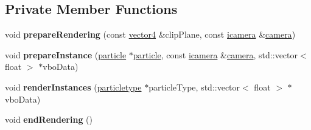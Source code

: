 \subsection*{Private Member Functions}
\begin{DoxyCompactItemize}
\item 
\mbox{\label{classflounder_1_1rendererparticles_a12c825ccf5a57a3af4cb04b3b2871ca4}} 
void {\bfseries prepare\+Rendering} (const \hyperlink{classflounder_1_1vector4}{vector4} \&clip\+Plane, const \hyperlink{classflounder_1_1icamera}{icamera} \&\hyperlink{classflounder_1_1camera}{camera})
\item 
\mbox{\label{classflounder_1_1rendererparticles_a8e1eee2b2acbbdb967e4f4df6f025b07}} 
void {\bfseries prepare\+Instance} (\hyperlink{classflounder_1_1particle}{particle} $\ast$\hyperlink{classflounder_1_1particle}{particle}, const \hyperlink{classflounder_1_1icamera}{icamera} \&\hyperlink{classflounder_1_1camera}{camera}, std\+::vector$<$ float $>$ $\ast$vbo\+Data)
\item 
\mbox{\label{classflounder_1_1rendererparticles_a8adffe03cf872f70f5bfa8bf130adb8e}} 
void {\bfseries render\+Instances} (\hyperlink{classflounder_1_1particletype}{particletype} $\ast$particle\+Type, std\+::vector$<$ float $>$ $\ast$vbo\+Data)
\item 
\mbox{\label{classflounder_1_1rendererparticles_ae113b43abf16b73819569e04f555d364}} 
void {\bfseries end\+Rendering} ()
\end{DoxyCompactItemize}
